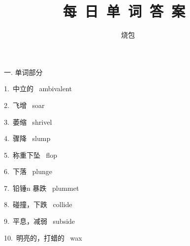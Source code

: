 \documentclass[a4paper, 12pt]{article}
\begin{document}
    \noindent

    \title{ 每\ 日\ 单\ 词\ 答\ 案\  }
    \author{ 烧包 }
    \maketitle

\begin{flushleft}
一. 单词部分
\end{flushleft}

\begin{multicols}{2}
\begin{flushleft}
1.\ 中立的 \ ambivalent
\end{flushleft}

\begin{flushleft}
2.\ 飞增 \ soar
\end{flushleft}
\end{multicols}

\begin{multicols}{2}
\begin{flushleft}
3.\ 萎缩 \ shrivel
\end{flushleft}

\begin{flushleft}
4.\ 骤降 \ slump
\end{flushleft}
\end{multicols}

\begin{multicols}{2}
\begin{flushleft}
5.\ 称重下坠 \ flop
\end{flushleft}

\begin{flushleft}
6.\ 下落 \ plunge
\end{flushleft}
\end{multicols}

\begin{multicols}{2}
\begin{flushleft}
7.\ 铅锤n 暴跌 \ plummet
\end{flushleft}

\begin{flushleft}
8.\ 碰撞，下跌 \ collide
\end{flushleft}
\end{multicols}

\begin{multicols}{2}
\begin{flushleft}
9.\ 平息，减弱 \ subside
\end{flushleft}

\begin{flushleft}
10.\ 明亮的，打蜡的 \ wax
\end{flushleft}
\end{multicols}
\end{document}
